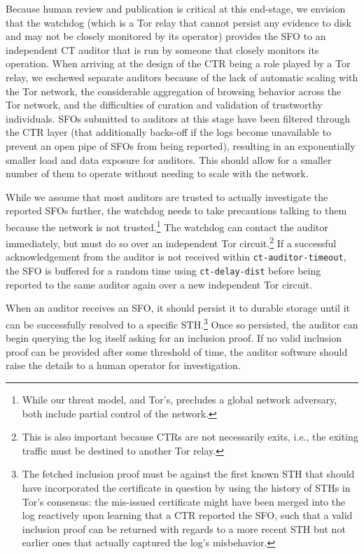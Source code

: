 Because human review and publication is critical at this end-stage, we envision
that the watchdog (which is a Tor relay that cannot persist any evidence to disk
and may not be closely monitored by its operator) provides the SFO to an
independent CT auditor that is run by someone that closely monitors its
operation. When arriving at the design of the CTR being a
role played by a Tor relay, we eschewed separate auditors because of the lack of
automatic scaling with the Tor network, the considerable aggregation of browsing
behavior across the Tor network, and the difficulties of curation and validation
of trustworthy individuals. SFOs submitted to auditors at this stage have been
filtered through the CTR layer (that additionally backs-off if the logs become
unavailable to prevent an open pipe of SFOs from being reported), resulting in
an exponentially smaller load and data exposure for auditors. This should allow
for a smaller number of them to operate without needing to scale with the
network.

While we assume that most auditors are trusted to actually investigate the
reported SFOs further, the watchdog needs to take precautions talking to them
because the network is not trusted.\footnote{%
	While our threat model, and Tor's, precludes a global network adversary,
	both include partial control of the network.
}  The watchdog can contact the auditor immediately, but must do so over
an independent Tor circuit.\footnote{%
	This is also important because CTRs are not necessarily exits, i.e., the
	exiting traffic must be destined to another Tor relay.
}  If a successful acknowledgement from the auditor is not received within
\texttt{ct-auditor-timeout}, the SFO is buffered for a random time using
\texttt{ct-delay-dist} before being reported to the same auditor again over a
new independent Tor circuit.

When an auditor receives an SFO, it should persist it to durable storage until
it can be successfully resolved to a specific STH.\footnote{%
	The fetched inclusion proof must be against the first known STH that
	should have incorporated the certificate in question by using the
	history of STHs in Tor's consensus:
		the mis-issued certificate might have been merged into the log
		reactively upon learning that a CTR reported the SFO, such that a valid
		inclusion proof can be returned with regards to a more recent STH but
		not earlier ones that actually captured the log's misbehavior.
}  Once so persisted, the auditor can begin querying the log itself asking for
an inclusion proof. If no valid inclusion proof can be provided after some
threshold of time, the auditor software should raise the details to a human
operator for investigation.

